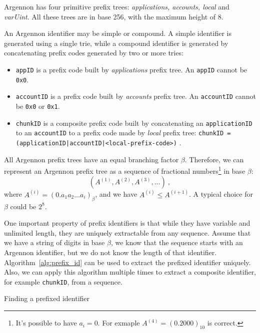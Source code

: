 Argennon has four primitive prefix trees:
\emph{applications, accounts, local} and \emph{varUint}.
All these trees are in base 256, with the maximum height
of 8.

An Argennon identifier may be simple or compound. A simple identifier is generated using a single trie, while a
compound identifier is generated by concatenating prefix codes generated by two or more tries:

\begin{itemize}
    \item \texttt{appID} is a prefix code built by \emph{applications} prefix tree. An \texttt{appID} cannot
    be \texttt{0x0}.

    \item \texttt{accountID} is a prefix code built by \emph{accounts} prefix tree. An \texttt{accountID} cannot
    be \texttt{0x0} or \texttt{0x1}.

    \item \texttt{chunkID} is a composite prefix code built by concatenating an \texttt{applicationID} to
    an \texttt{accountID} to a prefix code made by \emph{local} prefix tree:
    \subitem \texttt{chunkID = (applicationID|accountID|<local-prefix-code>)} .
\end{itemize}

All Argennon prefix trees have an equal branching factor \(\beta\). Therefore, we can represent an Argennon
prefix tree as a sequence of fractional numbers\footnote{It's possible to have \(a_i=0\). For
exmaple \(A^{(4)}=(0.2000)_{10}\) is correct.} in base \(\beta\):
\[
    (A^{(1)},A^{(2)},A^{(3)},\dots)\ ,
\]
where \(A^{(i)}=(0.a_{1}a_{2}\dots a_{i})_\beta\), and we have \(A^{(i)} \leq A^{(i+1)}\). A typical choice for
\(\beta\) could be \(2^8\).

One important property of prefix identifiers is that while they have variable and unlimited length, they are
uniquely extractable from any sequence. Assume that we have a string of digits in base $\beta$, we
know that the sequence starts with an Argennon identifier, but we do not know the length of that identifier.
Algorithm~\ref{alg:prefix_id} can be used to extract the prefixed identifier uniquely. Also, we can apply this algorithm
multiple times to extract a composite identifier, for example \texttt{chunkID}, from a sequence.

\begin{algorithm}[t]
    \DontPrintSemicolon
    \BlankLine
    \BlankLine
    {
        {
            \;
        }
    }
    \;
    \caption{Finding a prefixed identifier}\label{alg:prefix_id}
\end{algorithm}

